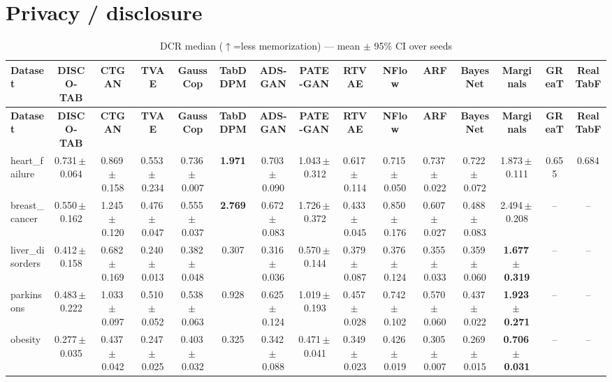 \documentclass[8pt]{extarticle}
\begin{document}
\section*{Privacy / disclosure}
\begin{longtable}{l*{14}{c}}
\caption{DCR median ($\uparrow$=less memorization) --- mean $\pm$ 95\% CI over seeds}\\
\toprule
\textbf{Dataset} & \textbf{DISCO-TAB} & \textbf{CTGAN} & \textbf{TVAE} & \textbf{GaussCop} & \textbf{TabDDPM} & \textbf{ADS-GAN} & \textbf{PATE-GAN} & \textbf{RTVAE} & \textbf{NFlow} & \textbf{ARF} & \textbf{BayesNet} & \textbf{Marginals} & \textbf{GReaT} & \textbf{RealTabF} \\
\midrule
\endfirsthead
\toprule
\textbf{Dataset} & \textbf{DISCO-TAB} & \textbf{CTGAN} & \textbf{TVAE} & \textbf{GaussCop} & \textbf{TabDDPM} & \textbf{ADS-GAN} & \textbf{PATE-GAN} & \textbf{RTVAE} & \textbf{NFlow} & \textbf{ARF} & \textbf{BayesNet} & \textbf{Marginals} & \textbf{GReaT} & \textbf{RealTabF} \\
\midrule
\endhead
\bottomrule
\endfoot
heart\_failure & 0.731\,$\pm$\,0.064 & 0.869\,$\pm$\,0.158 & 0.553\,$\pm$\,0.234 & 0.736\,$\pm$\,0.007 & \textbf{1.971} & 0.703\,$\pm$\,0.090 & 1.043\,$\pm$\,0.312 & 0.617\,$\pm$\,0.114 & 0.715\,$\pm$\,0.050 & 0.737\,$\pm$\,0.022 & 0.722\,$\pm$\,0.072 & 1.873\,$\pm$\,0.111 & 0.655 & 0.684 \\
breast\_cancer & 0.550\,$\pm$\,0.162 & 1.245\,$\pm$\,0.120 & 0.476\,$\pm$\,0.047 & 0.555\,$\pm$\,0.037 & \textbf{2.769} & 0.672\,$\pm$\,0.083 & 1.726\,$\pm$\,0.372 & 0.433\,$\pm$\,0.045 & 0.850\,$\pm$\,0.176 & 0.607\,$\pm$\,0.027 & 0.488\,$\pm$\,0.083 & 2.494\,$\pm$\,0.208 & -- & -- \\
liver\_disorders & 0.412\,$\pm$\,0.158 & 0.682\,$\pm$\,0.169 & 0.240\,$\pm$\,0.013 & 0.382\,$\pm$\,0.048 & 0.307 & 0.316\,$\pm$\,0.036 & 0.570\,$\pm$\,0.144 & 0.379\,$\pm$\,0.087 & 0.376\,$\pm$\,0.124 & 0.355\,$\pm$\,0.033 & 0.359\,$\pm$\,0.060 & \textbf{1.677\,$\pm$\,0.319} & -- & -- \\
parkinsons & 0.483\,$\pm$\,0.222 & 1.033\,$\pm$\,0.097 & 0.510\,$\pm$\,0.052 & 0.538\,$\pm$\,0.063 & 0.928 & 0.625\,$\pm$\,0.124 & 1.019\,$\pm$\,0.193 & 0.457\,$\pm$\,0.028 & 0.742\,$\pm$\,0.102 & 0.570\,$\pm$\,0.060 & 0.437\,$\pm$\,0.022 & \textbf{1.923\,$\pm$\,0.271} & -- & -- \\
obesity & 0.277\,$\pm$\,0.035 & 0.437\,$\pm$\,0.042 & 0.247\,$\pm$\,0.025 & 0.403\,$\pm$\,0.032 & 0.325 & 0.342\,$\pm$\,0.088 & 0.471\,$\pm$\,0.041 & 0.349\,$\pm$\,0.023 & 0.426\,$\pm$\,0.019 & 0.305\,$\pm$\,0.007 & 0.269\,$\pm$\,0.015 & \textbf{0.706\,$\pm$\,0.031} & -- & -- \\

\end{longtable}
\end{document}
